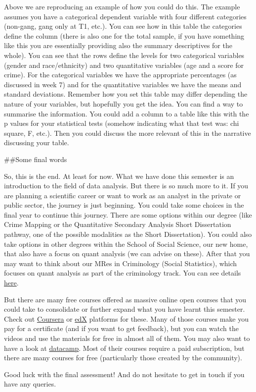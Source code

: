 \documentclass[
]{book}
\begin{document}
Above we are reproducing an example of how you could do this. The example assumes you have a categorical dependent variable with four different categories (non-gang, gang only at T1, etc.). You can see how in this table the categories define the column (there is also one for the total sample, if you have something like this you are essentially providing also the summary descriptives for the whole). You can see that the rows define the levels for two categorical variables (gender and race/ethnicity) and two quantitative variables (age and a score for crime). For the categorical variables we have the appropriate percentages (as discussed in week 7) and for the quantitative variables we have the means and standard deviations. Remember how you set this table may differ depending the nature of your variables, but hopefully you get the idea. You can find a way to summarise the information. You could add a column to a table like this with the p values for your statistical tests (somehow indicating what that test was: chi square, F, etc.). Then you could discuss the more relevant of this in the narrative discussing your table.

\#\#Some final words

So, this is the end. At least for now. What we have done this semester is an introduction to the field of data analysis. But there is so much more to it. If you are planning a scientific career or want to work as an analyst in the private or public sector, the journey is just beginning. You could take some choices in the final year to continue this journey. There are some options within our degree (like Crime Mapping or the Quantitative Secondary Analysis Short Dissertation pathway, one of the possible modalities as the Short Dissertation). You could also take options in other degrees within the School of Social Science, our new home, that also have a focus on quant analysis (we can advise on these). After that you may want to think about our MRes in Criminology (Social Statistics), which focuses on quant analysis as part of the criminology track. You can see details \href{https://www.manchester.ac.uk/study/masters/courses/list/10377/mres-criminology-social-statistics/}{here}.

But there are many free courses offered as massive online open courses that you could take to consolidate or further expand what you have learnt this semester. Check out \href{https://www.coursera.org/browse/data-science}{Coursera} or \href{https://www.edx.org/course/subject/data-science}{edX} platforms for these. Many of those courses make you pay for a certificate (and if you want to get feedback), but you can watch the videos and use the materials for free in almost all of them. You may also want to have a look at \href{https://www.datacamp.com}{datacamp}. Most of their courses require a paid subscription, but there are many courses for free (particularly those created by the community).

Good luck with the final assessment! And do not hesitate to get in touch if you have any queries.
\end{document}
